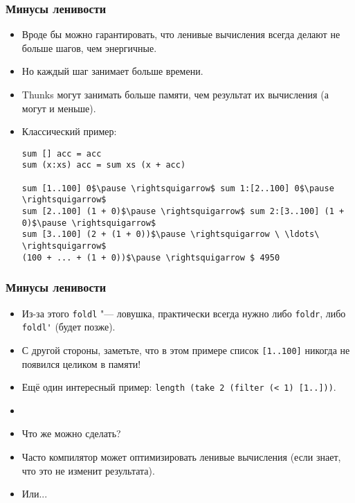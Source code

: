 \documentclass[11pt]{beamer}
\begin{document}
\begin{frame}[fragile]
\frametitle{Минусы ленивости}
\begin{itemize}
    \item Вроде бы можно гарантировать, что ленивые вычисления всегда делают не больше шагов, чем энергичные.
    \item Но каждый шаг занимает больше времени.
    \item Thunks могут занимать больше памяти, чем результат их вычисления (а могут и меньше).
    \item Классический пример:
\begin{lstlisting}[basicstyle=\ttfamily\small,mathescape]
sum [] acc = acc
sum (x:xs) acc = sum xs (x + acc)

sum [1..100] 0$\pause \rightsquigarrow$ sum 1:[2..100] 0$\pause \rightsquigarrow$
sum [2..100] (1 + 0)$\pause \rightsquigarrow$ sum 2:[3..100] (1 + 0)$\pause \rightsquigarrow$
sum [3..100] (2 + (1 + 0))$\pause \rightsquigarrow \ \ldots\ \rightsquigarrow$
(100 + ... + (1 + 0))$\pause \rightsquigarrow $ 4950
\end{lstlisting}
    \end{itemize}
\end{frame}

\begin{frame}[fragile]
\frametitle{Минусы ленивости}
\begin{itemize}
    \item Из-за этого \lstinline|foldl| "--- ловушка, практически всегда нужно либо \lstinline|foldr|, либо \lstinline|foldl'| (будет позже).
    \pause
    \item С другой стороны, заметьте, что в этом примере список \lstinline|[1..100]| никогда не появился целиком в памяти!
    \pause
    \item Ещё один интересный пример: \lstinline|length (take 2 (filter (< 1) [1..]))|.
    \item[]
    \pause
    \item Что же можно сделать?
    \pause
    \item Часто компилятор может оптимизировать ленивые вычисления (если знает, что это не изменит результата).
    \item Или...
\end{itemize}
\end{frame}
\end{document}
